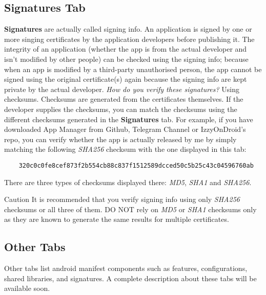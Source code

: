 \subsection{Signatures Tab}\label{subsec:signatures-tab}
\textbf{Signatures} are actually called signing info. An application is signed by one or more singing certificates by
the application developers before publishing it. The integrity of an application (whether the app is from the actual
developer and isn't modified by other people) can be checked using the signing info; because when an app is modified by
a third-party unauthorised person, the app cannot be signed using the original certificate(s) again because the signing
info are kept private by the actual developer. \textit{How do you verify these signatures?} Using checksums. Checksums
are generated from the certificates themselves. If the developer supplies the checksums, you can match the checksums
using the different checksums generated in the \textbf{Signatures} tab. For example, if you have downloaded App Manager
from Github, Telegram Channel or IzzyOnDroid's repo, you can verify whether the app is actually released by me by simply
matching the following \textit{SHA256} checksum with the one displayed in this tab:
\begin{Verbatim}
    320c0c0fe8cef873f2b554cb88c837f1512589dcced50c5b25c43c04596760ab
\end{Verbatim}

There are three types of checksums displayed there: \textit{MD5}, \textit{SHA1} and \textit{SHA256}.

\begin{danger}{Caution}
    It is recommended that you verify signing info using only \textit{SHA256} checksums or all three of them. DO NOT
    rely on \textit{MD5} or \textit{SHA1} checksums only as they are known to generate the same results for multiple
    certificates.
\end{danger}

\subsection{Other Tabs}\label{subsec:other-tabs}
Other tabs list android manifest components such as features, configurations, shared libraries, and signatures. A
complete description about these tabs will be available soon.
